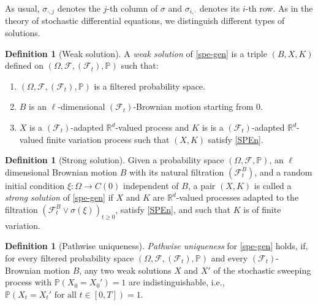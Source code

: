 \documentclass[preprint,12pt]{elsarticle}
\newcommand{\R}{\mathbb{R}}
\theoremstyle{plain}
\theoremstyle{definition}
\newtheorem{definition}[theorem]{Definition}
\theoremstyle{remark}
\begin{document}
    As usual, $\sigma_{\cdot,j}$ denotes the $j$-th column of $\sigma$ and $\sigma_{i,\cdot}$ denotes its $i$-th row. 
As in the theory of stochastic differential equations, we distinguish different types of solutions. 

    \begin{definition}[Weak solution]
        A \emph{weak solution} of \eqref{spe-gen} is a triple $(B,X,K)$ defined on $(\Omega, \mathcal{F},(\mathcal{F}_t), \mathbb{P})$ such that:
        \begin{enumerate}[label=(\roman*)]
			\item $(\Omega,\mathcal{F},(\mathcal{F}_t),\mathbb{P})$ is a filtered probability space.
			\item $B$ is an $\ell$-dimensional $(\mathcal{F}_t)$-Brownian motion starting from $0$. 
			\item $X$ is a $(\mathcal{F}_t)$-adapted $\R^d$-valued process and $K$ is is a $(\mathcal{F}_t)$-adapted $\R^d$-valued finite variation process such that $(X,K)$ satisfy \eqref{SPEn}.
		\end{enumerate}
    \end{definition}

    \begin{definition}[Strong solution]
        Given a probability space $(\Omega, \mathcal{F}, \mathbb{P})$, an $\ell$ dimensional Brownian motion $B$ with its natural filtration $(\mathcal{F}^B_t)$, and a random initial condition $\xi\colon \Omega \to C(0)$ independent of $B$, a pair $(X,K)$ is called a \emph{strong solution} of \eqref{spe-gen} if $X$ and $K$ are $\R^d$-valued processes adapted to the filtration $(\mathcal{F}^B_t \vee \sigma(\xi))_{t\ge 0}$, satisfy \eqref{SPEn}, and such that $K$ is of finite variation.

    \end{definition}
	\begin{definition}[Pathwise uniqueness]
		\emph{Pathwise uniqueness} for \eqref{spe-gen} holds, if, for every filtered probability space $(\Omega,\mathcal{F},(\mathcal{F}_t),\mathbb{P})$ and every $(\mathcal{F}_t)$-Brownian motion $B$, any two weak solutions $X$ and $X'$ of the stochastic sweeping process with $\mathbb{P}(X_0 = X_0') = 1$ are indistinguishable, i.e.,  $\mathbb{P}(X_t= X_t' \textrm{ for all } t\in [0,T])=1.$
	\end{definition}
\end{document}
